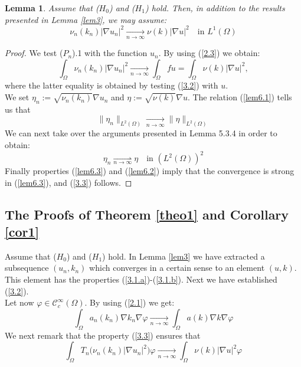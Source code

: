 \documentclass{elsart}
\newtheorem{lemm}[defi]{Lemma}
\begin{document}
\begin{lemm}\label{lem6}
Assume that ($H_0$) and ($H_1$) hold. Then, in addition to the results
presented in Lemma \ref{lem3}, we may assume: 
\begin{equation}
\nu_n(k_n)|\nabla u_n|^2 \underset{n\to\infty}{\rightarrow} 
\nu(k)|\nabla u|^2 \quad \text{in } L^1(\Omega) \label{3.3}
\end{equation}
\end{lemm}
\begin{proof}
We test ($P_n$).1 with the function $u_n$. By using (\ref{2.3}) we
obtain: 
\begin{equation}
\int_{\Omega}\nu_n(k_n)|\nabla u_n|^2
 \underset{n\to\infty}{\rightarrow} 
\int_{\Omega} f u = \int_{\Omega} \nu(k)|\nabla u|^2, \label{lem6.1}
\end{equation}
where the latter equality is obtained by testing (\ref{3.2}) with
$u$. \\ 
We set $\eta_n:=\sqrt{\nu_n(k_n)}\nabla u_n
$ and $\eta:=\sqrt{\nu(k)}\nabla u$. The relation (\ref{lem6.1}) tells
us that 
\begin{equation}
\|\eta_n\|_{L^2(\Omega)} \underset{n \to \infty}{\rightarrow} \|\eta\|_{L^2(\Omega)}
\label{lem6.2}
\end{equation}
We can next take over the arguments presented in \cite{lewan} Lemma
5.3.4 in order to obtain:
\begin{equation}
\eta_n \underset{n \to \infty}{\rightharpoonup} \eta \quad \text{in } (L^2(\Omega))^2
\label{lem6.3}
\end{equation}
Finally properties (\ref{lem6.3}) and (\ref{lem6.2}) imply that 
the convergence is strong in (\ref{lem6.3}), and (\ref{3.3}) follows. 
\end{proof}

\subsection{The Proofs of Theorem \ref{theo1} and Corollary \ref{cor1}}
 
Assume that ($H_0$) and ($H_1$) hold. In Lemma \ref{lem3} we have
extracted a subsequence $(u_n,k_n)$ which converges in a certain 
sense to an element $(u,k)$. This element has the properties
(\ref{3.1.a})-(\ref{3.1.b}). 
Next we have established (\ref{3.2}). \\ 
Let now $\varphi \in \mathcal{C}_{c}^{\infty}(\Omega)$. By using
(\ref{2.1}) we get: 
\begin{equation} 
\int_{\Omega}a_n(k_n)\nabla k_n \nabla \varphi
\underset{n\to\infty}{\rightarrow} 
\int_{\Omega}a(k)\nabla k \nabla \varphi
 \label{toto1}
\end{equation}
We next remark that the property (\ref{3.3}) ensures that 
\begin{equation}
\int_{\Omega}T_n\big(\nu_n(k_n)|\nabla u_n|^2\big)\varphi 
 \underset{n\to\infty}{\rightarrow} 
\int_{\Omega}\nu(k)|\nabla u|^2\varphi \label{toto2}
\end{equation}
\end{document}
